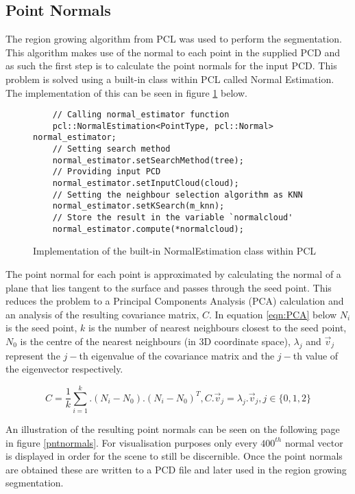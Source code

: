 \subsection{Point Normals}
The region growing algorithm from PCL was used to perform the segmentation. This algorithm makes use of the normal to each point in the supplied PCD and as such the first step is to calculate the point normals for the input PCD. This problem is solved using a built-in class within PCL called Normal Estimation. The implementation of this can be seen in figure \ref{normalestimation} below.
\newline
\begin{figure}[h!]
\begin{lstlisting}
	// Calling normal_estimator function
	pcl::NormalEstimation<PointType, pcl::Normal> normal_estimator;
	// Setting search method 
	normal_estimator.setSearchMethod(tree);
	// Providing input PCD
	normal_estimator.setInputCloud(cloud);
	// Setting the neighbour selection algorithm as KNN
	normal_estimator.setKSearch(m_knn);
	// Store the result in the variable `normalcloud'
	normal_estimator.compute(*normalcloud);
\end{lstlisting}
\caption{Implementation of the built-in NormalEstimation class within PCL \label{normalestimation}}\end{figure}

The point normal for each point is approximated by calculating the normal of a plane that lies tangent to the surface and passes through the seed point. This reduces the problem to a Principal Components Analysis (PCA) calculation and an analysis of the resulting covariance matrix, $C$. In equation \ref{eqn:PCA} below $N_{i}$ is the seed point, $k$ is the number of nearest neighbours closest to the seed point, $N_0$ is the centre of the nearest neighbours (in 3D coordinate space), $\lambda_j$ and $\vec{v}_j$ represent the $j-$th eigenvalue of the covariance matrix and the $j-$th value of the eigenvector respectively.

\begin{equation}\label{eqn:PCA}
C = \frac{1}{k} \sum_{i=1}^{k}.(N_i-N_0).(N_i-N_0)^T, C.\vec{v}_j = \lambda_j.\vec{v}_j, j \in\{0,1,2\}
\end{equation}

An illustration of the resulting point normals can be seen on the following page in figure \ref{pntnormals}. For visualisation purposes only every $400^{th}$ normal vector is displayed in order for the scene to still be discernible.
Once the point normals are obtained these are written to a PCD file and later used in the region growing segmentation. 

